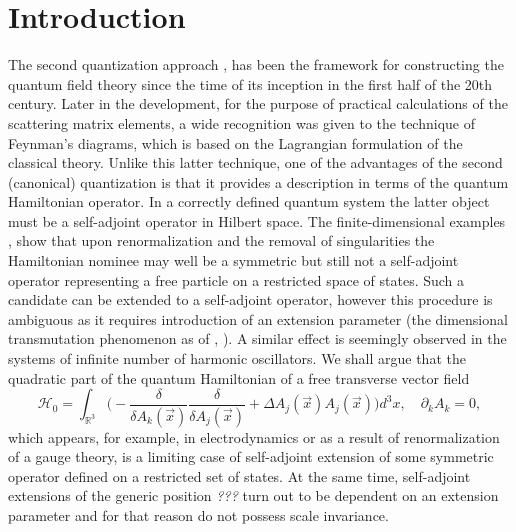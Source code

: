 \documentclass[12pt]{article}
\newcommand{\HH}{\mathscr{H}}
\newcommand{\RR}{\mathbb{R}}
\begin{document}
\section*{Introduction}
	The second quantization approach
\cite{Dirac}, \cite{Becchi}
	has been the framework for constructing the quantum field theory
	since the time of its inception in the first half of the 20th century.
	Later in the development, for the purpose of practical calculations
	of the scattering matrix elements, a wide recognition was given
	to the technique of Feynman's diagrams,
        which is based on the Lagrangian formulation of the classical theory.
	Unlike this latter technique, one of the advantages of the second
	(canonical) quantization is that it provides a description in terms
    of the quantum Hamiltonian operator.
	In a correctly defined quantum system the latter object must be
	a self-adjoint operator in Hilbert space.
	The finite-dimensional examples 
\cite{BF},
\cite{Jackiw}
	show that upon renormalization and the removal of singularities
	the Hamiltonian nominee may well be a symmetric but still not
	a self-adjoint operator representing
    a free particle on a restricted space of states.
	Such a candidate can be extended to a self-adjoint operator,
    however this procedure is ambiguous as it requires introduction
    of an extension parameter (the dimensional transmutation phenomenon as of
\cite{Jackiw},
\cite{LFres}).
    A similar effect is seemingly observed in the systems of infinite number
    of harmonic oscillators.
	We shall argue that the quadratic part of the quantum Hamiltonian of a free transverse vector field
\begin{equation*}
    \HH_{0} = \int_{\RR^{3}} \bigl(-\frac{\delta}{\delta A_{k}(\vec{x})}
	\frac{\delta}{\delta A_{j}(\vec{x})}
	+ \Delta A_{j}(\vec{x}) A_{j}(\vec{x}) \bigr)d^{3}x, 
    \quad \partial_{k} A_{k} = 0 ,
\end{equation*}
    which appears, for example, in electrodynamics or as a result of
    renormalization of a gauge theory, is a limiting case of self-adjoint
    extension of some symmetric operator defined on a restricted set
    of states.
    At the same time, self-adjoint extensions of the generic position {\it ???}
    turn out to be dependent on an extension parameter and for that
    reason do not possess scale invariance.
\end{document}
